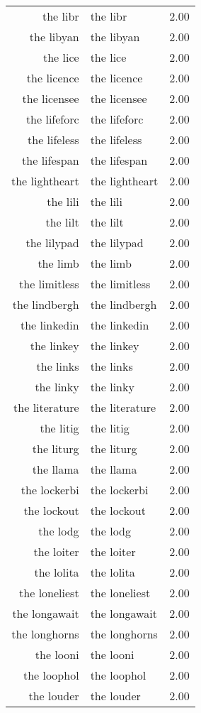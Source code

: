 \begin{table}[ht]
\begin{tabular}{rlr}
  the libr & the libr & 2.00 \\ 
  the libyan & the libyan & 2.00 \\ 
  the lice & the lice & 2.00 \\ 
  the licence & the licence & 2.00 \\ 
  the licensee & the licensee & 2.00 \\ 
  the lifeforc & the lifeforc & 2.00 \\ 
  the lifeless & the lifeless & 2.00 \\ 
  the lifespan & the lifespan & 2.00 \\ 
  the lightheart & the lightheart & 2.00 \\ 
  the lili & the lili & 2.00 \\ 
  the lilt & the lilt & 2.00 \\ 
  the lilypad & the lilypad & 2.00 \\ 
  the limb & the limb & 2.00 \\ 
  the limitless & the limitless & 2.00 \\ 
  the lindbergh & the lindbergh & 2.00 \\ 
  the linkedin & the linkedin & 2.00 \\ 
  the linkey & the linkey & 2.00 \\ 
  the links & the links & 2.00 \\ 
  the linky & the linky & 2.00 \\ 
  the literature & the literature & 2.00 \\ 
  the litig & the litig & 2.00 \\ 
  the liturg & the liturg & 2.00 \\ 
  the llama & the llama & 2.00 \\ 
  the lockerbi & the lockerbi & 2.00 \\ 
  the lockout & the lockout & 2.00 \\ 
  the lodg & the lodg & 2.00 \\ 
  the loiter & the loiter & 2.00 \\ 
  the lolita & the lolita & 2.00 \\ 
  the loneliest & the loneliest & 2.00 \\ 
  the longawait & the longawait & 2.00 \\ 
  the longhorns & the longhorns & 2.00 \\ 
  the looni & the looni & 2.00 \\ 
  the loophol & the loophol & 2.00 \\ 
  the louder & the louder & 2.00 \\ 

\end{tabular}
\end{table}
